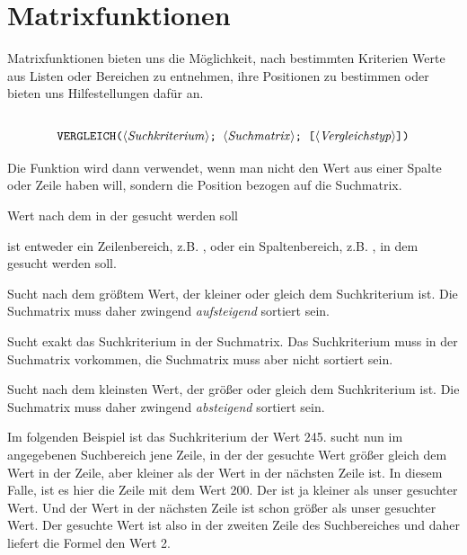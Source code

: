 
\section{Matrixfunktionen}

Matrixfunktionen bieten uns die Möglichkeit, nach bestimmten Kriterien Werte aus Listen oder Bereichen zu entnehmen, ihre Positionen zu bestimmen oder bieten uns Hilfestellungen dafür an. 


\subsection{}

$$ \text{\stmt{   VERGLEICH(\syntax{Suchkriterium}; \syntax{Suchmatrix}; [\syntax{Vergleichstyp}])  }}$$

Die  Funktion wird dann verwendet, wenn man nicht den Wert aus einer Spalte oder Zeile haben will, sondern die Position bezogen auf die Suchmatrix.


\begin{description}[labelindent=0cm, leftmargin=3cm, font=\mdseries, labelwidth=3cm,style=nextline]
\item[\syntax{Suchkriterium}] Wert nach dem in der  gesucht werden soll
\item[\syntax{Suchmatrix}] ist entweder ein Zeilenbereich, z.B. , oder ein Spaltenbereich, z.B. , in dem gesucht werden soll.
\item[\syntax{Vergleichstyp}] %
	\begin{description}[labelindent=0cm, leftmargin=2cm, font=\mdseries, labelwidth=2cm,style=nextline]
	\item[1 (default)] Sucht nach dem größtem Wert, der kleiner oder gleich dem Suchkriterium ist. Die Suchmatrix muss daher zwingend \textsl{aufsteigend} sortiert sein.
	\item[0] Sucht exakt das Suchkriterium in der Suchmatrix. Das Suchkriterium muss in
der Suchmatrix vorkommen, die Suchmatrix muss aber nicht sortiert sein.
	\item[-1] Sucht nach dem kleinsten Wert, der größer oder gleich dem Suchkriterium ist.
Die Suchmatrix muss daher zwingend \textsl{absteigend} sortiert sein.
	\end{description}

\end{description}

Im folgenden Beispiel ist das Suchkriterium der Wert 245.  sucht nun im angegebenen Suchbereich jene Zeile, in der der gesuchte Wert größer gleich dem Wert in der Zeile, aber kleiner als der Wert in der nächsten Zeile ist. In diesem Falle, ist es hier die Zeile mit dem Wert 200. Der ist ja kleiner als unser gesuchter Wert. Und der Wert in der nächsten Zeile ist schon größer als unser gesuchter Wert. Der gesuchte Wert ist also in der zweiten Zeile des Suchbereiches und daher liefert die Formel den Wert 2.

